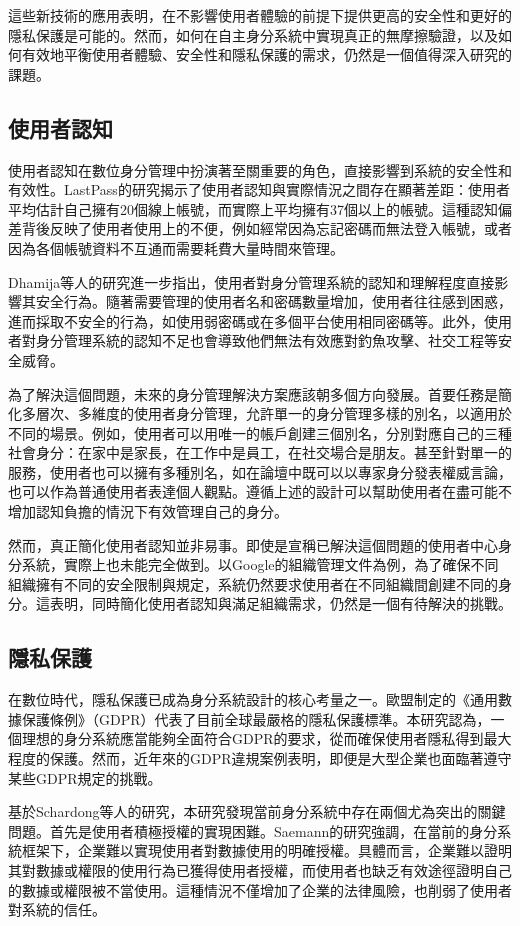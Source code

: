 這些新技術的應用表明，在不影響使用者體驗的前提下提供更高的安全性和更好的隱私保護是可能的。然而，如何在自主身分系統中實現真正的無摩擦驗證，以及如何有效地平衡使用者體驗、安全性和隱私保護的需求，仍然是一個值得深入研究的課題。
\subsection{使用者認知}
使用者認知在數位身分管理中扮演著至關重要的角色，直接影響到系統的安全性和有效性。LastPass\cite{lastpass2020psychology}的研究揭示了使用者認知與實際情況之間存在顯著差距：使用者平均估計自己擁有20個線上帳號，而實際上平均擁有37個以上的帳號。這種認知偏差背後反映了使用者使用上的不便，例如經常因為忘記密碼而無法登入帳號，或者因為各個帳號資料不互通而需要耗費大量時間來管理。

Dhamija等人\cite{dhamija2008sevenflaws}的研究進一步指出，使用者對身分管理系統的認知和理解程度直接影響其安全行為。隨著需要管理的使用者名和密碼數量增加，使用者往往感到困惑，進而採取不安全的行為，如使用弱密碼或在多個平台使用相同密碼等。此外，使用者對身分管理系統的認知不足也會導致他們無法有效應對釣魚攻擊、社交工程等安全威脅。

為了解決這個問題，未來的身分管理解決方案應該朝多個方向發展。首要任務是簡化多層次、多維度的使用者身分管理，允許單一的身分管理多樣的別名，以適用於不同的場景。例如，使用者可以用唯一的帳戶創建三個別名，分別對應自己的三種社會身分：在家中是家長，在工作中是員工，在社交場合是朋友。甚至針對單一的服務，使用者也可以擁有多種別名，如在論壇中既可以以專家身分發表權威言論，也可以作為普通使用者表達個人觀點。遵循上述的設計可以幫助使用者在盡可能不增加認知負擔的情況下有效管理自己的身分。

然而，真正簡化使用者認知並非易事。即使是宣稱已解決這個問題的使用者中心身分系統，實際上也未能完全做到。以Google的組織管理文件\cite{gcp2024identity}為例，為了確保不同組織擁有不同的安全限制與規定，系統仍然要求使用者在不同組織間創建不同的身分。這表明，同時簡化使用者認知與滿足組織需求，仍然是一個有待解決的挑戰。
\subsection{隱私保護}
在數位時代，隱私保護已成為身分系統設計的核心考量之一。歐盟制定的《通用數據保護條例》（GDPR）\cite{GDPR2016}代表了目前全球最嚴格的隱私保護標準。本研究認為，一個理想的身分系統應當能夠全面符合GDPR的要求，從而確保使用者隱私得到最大程度的保護。然而，近年來的GDPR違規案例表明，即便是大型企業也面臨著遵守某些GDPR規定的挑戰。

基於Schardong等人的研究\cite{s22155641}，本研究發現當前身分系統中存在兩個尤為突出的關鍵問題。首先是使用者積極授權的實現困難。Saemann\cite{saemann2022investigating}的研究強調，在當前的身分系統框架下，企業難以實現使用者對數據使用的明確授權。具體而言，企業難以證明其對數據或權限的使用行為已獲得使用者授權，而使用者也缺乏有效途徑證明自己的數據或權限被不當使用。這種情況不僅增加了企業的法律風險，也削弱了使用者對系統的信任。

